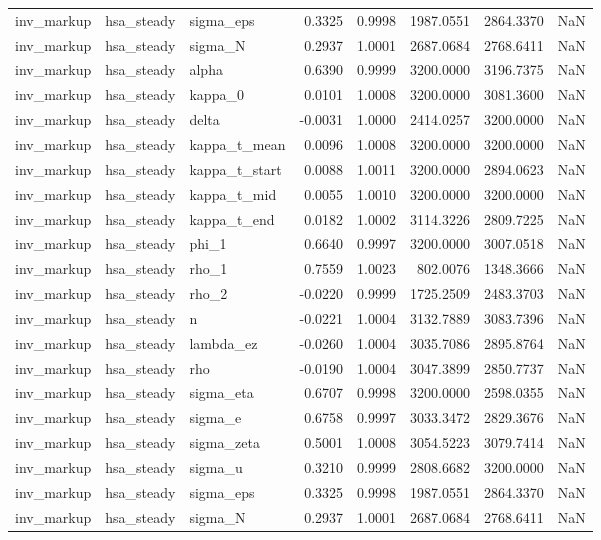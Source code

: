 \begin{tabular}{lllrrrrl}
inv\_markup & hsa\_steady & sigma\_eps & 0.3325 & 0.9998 & 1987.0551 & 2864.3370 & NaN \\
inv\_markup & hsa\_steady & sigma\_N & 0.2937 & 1.0001 & 2687.0684 & 2768.6411 & NaN \\
inv\_markup & hsa\_steady & alpha & 0.6390 & 0.9999 & 3200.0000 & 3196.7375 & NaN \\
inv\_markup & hsa\_steady & kappa\_0 & 0.0101 & 1.0008 & 3200.0000 & 3081.3600 & NaN \\
inv\_markup & hsa\_steady & delta & -0.0031 & 1.0000 & 2414.0257 & 3200.0000 & NaN \\
inv\_markup & hsa\_steady & kappa\_t\_mean & 0.0096 & 1.0008 & 3200.0000 & 3200.0000 & NaN \\
inv\_markup & hsa\_steady & kappa\_t\_start & 0.0088 & 1.0011 & 3200.0000 & 2894.0623 & NaN \\
inv\_markup & hsa\_steady & kappa\_t\_mid & 0.0055 & 1.0010 & 3200.0000 & 3200.0000 & NaN \\
inv\_markup & hsa\_steady & kappa\_t\_end & 0.0182 & 1.0002 & 3114.3226 & 2809.7225 & NaN \\
inv\_markup & hsa\_steady & phi\_1 & 0.6640 & 0.9997 & 3200.0000 & 3007.0518 & NaN \\
inv\_markup & hsa\_steady & rho\_1 & 0.7559 & 1.0023 & 802.0076 & 1348.3666 & NaN \\
inv\_markup & hsa\_steady & rho\_2 & -0.0220 & 0.9999 & 1725.2509 & 2483.3703 & NaN \\
inv\_markup & hsa\_steady & n & -0.0221 & 1.0004 & 3132.7889 & 3083.7396 & NaN \\
inv\_markup & hsa\_steady & lambda\_ez & -0.0260 & 1.0004 & 3035.7086 & 2895.8764 & NaN \\
inv\_markup & hsa\_steady & rho & -0.0190 & 1.0004 & 3047.3899 & 2850.7737 & NaN \\
inv\_markup & hsa\_steady & sigma\_eta & 0.6707 & 0.9998 & 3200.0000 & 2598.0355 & NaN \\
inv\_markup & hsa\_steady & sigma\_e & 0.6758 & 0.9997 & 3033.3472 & 2829.3676 & NaN \\
inv\_markup & hsa\_steady & sigma\_zeta & 0.5001 & 1.0008 & 3054.5223 & 3079.7414 & NaN \\
inv\_markup & hsa\_steady & sigma\_u & 0.3210 & 0.9999 & 2808.6682 & 3200.0000 & NaN \\
inv\_markup & hsa\_steady & sigma\_eps & 0.3325 & 0.9998 & 1987.0551 & 2864.3370 & NaN \\
inv\_markup & hsa\_steady & sigma\_N & 0.2937 & 1.0001 & 2687.0684 & 2768.6411 & NaN \\

\end{tabular}
